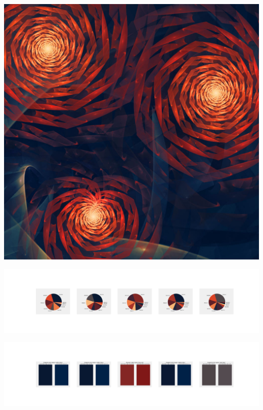 \documentclass[11pt]{article}
\begin{document}
\begin{landscape}
    \begin{center}
    \includegraphics[width=\textwidth]{./nbimg/file (319).jpg}
    \end{center}

    \begin{center}
    \includegraphics[width=250mm]{./nbimg/pie-244.jpg}
    \end{center}

    \begin{center}
    \includegraphics[width=250mm]{./nbimg/peak-244.jpg}
    \end{center}
    


\end{landscape}
\end{document}

